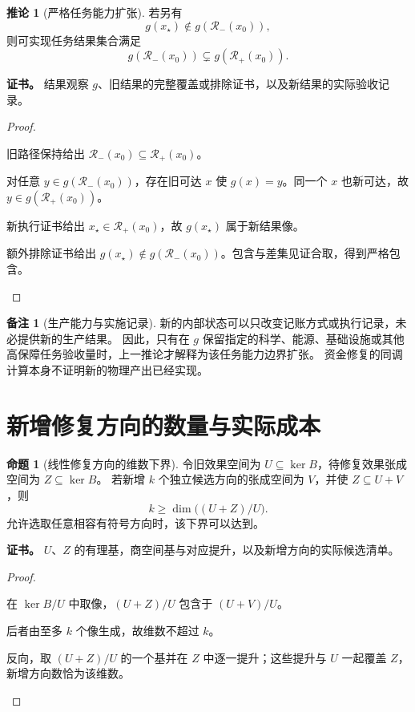 \documentclass[UTF8,12pt,a4paper,openany,fontset=none,zihao=false]{ctexrep}
\theoremstyle{definition}
\newtheorem{proposition}{命题}[chapter]
\newtheorem{corollary}{推论}[chapter]
\newtheorem{remark}{备注}[chapter]
\newenvironment{certificate}{\par\noindent\textbf{证书。}\ignorespaces}{\par}
\newcommand{\1}{\mathbf 1}
\begin{document}
\begin{corollary}[严格任务能力扩张]
\label{front:taskimage}
若另有
\[
g(x_\star)\notin g(\mathcal R_-(x_0)),
\]
则可实现任务结果集合满足
\[
g(\mathcal R_-(x_0))\subsetneq g(\mathcal R_+(x_0)).
\]
\end{corollary}
\begin{certificate}
结果观察 \(g\)、旧结果的完整覆盖或排除证书，以及新结果的实际验收记录。
\end{certificate}
\begin{proof}
\begin{semanticsteps}
\item 旧路径保持给出 \(\mathcal R_-(x_0)\subseteq\mathcal R_+(x_0)\)。
\item 对任意 \(y\in g(\mathcal R_-(x_0))\)，存在旧可达 \(x\) 使 \(g(x)=y\)。同一个 \(x\) 也新可达，故 \(y\in g(\mathcal R_+(x_0))\)。
\item 新执行证书给出 \(x_\star\in\mathcal R_+(x_0)\)，故 \(g(x_\star)\) 属于新结果像。
\item 额外排除证书给出 \(g(x_\star)\notin g(\mathcal R_-(x_0))\)。包含与差集见证合取，得到严格包含。
\end{semanticsteps}
\end{proof}

\begin{remark}[生产能力与实施记录]
新的内部状态可以只改变记账方式或执行记录，未必提供新的生产结果。
因此，只有在 \(g\) 保留指定的科学、能源、基础设施或其他高保障任务验收量时，上一推论才解释为该任务能力边界扩张。
资金修复的同调计算本身不证明新的物理产出已经实现。
\end{remark}

\section{新增修复方向的数量与实际成本}

\begin{proposition}[线性修复方向的维数下界]
\label{front:dimension}
令旧效果空间为 \(U\subseteq\ker B\)，待修复效果张成空间为 \(Z\subseteq\ker B\)。
若新增 \(k\) 个独立候选方向的张成空间为 \(V\)，并使 \(Z\subseteq U+V\)，则
\[
k\ge\dim\bigl((U+Z)/U\bigr).
\]
允许选取任意相容有符号方向时，该下界可以达到。
\end{proposition}
\begin{certificate}
\(U\)、\(Z\) 的有理基，商空间基与对应提升，以及新增方向的实际候选清单。
\end{certificate}
\begin{proof}
\begin{semanticsteps}
\item 在 \(\ker B/U\) 中取像，\((U+Z)/U\) 包含于 \((U+V)/U\)。
\item 后者由至多 \(k\) 个像生成，故维数不超过 \(k\)。
\item 反向，取 \((U+Z)/U\) 的一个基并在 \(Z\) 中逐一提升；这些提升与 \(U\) 一起覆盖 \(Z\)，新增方向数恰为该维数。
\end{semanticsteps}
\end{proof}
\end{document}
